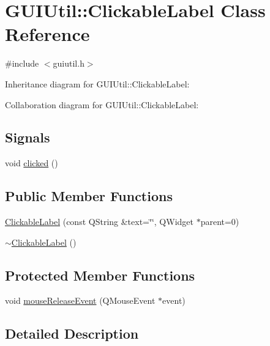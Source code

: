 \hypertarget{class_g_u_i_util_1_1_clickable_label}{}\section{G\+U\+I\+Util\+:\+:Clickable\+Label Class Reference}
\label{class_g_u_i_util_1_1_clickable_label}


{\ttfamily \#include $<$guiutil.\+h$>$}



Inheritance diagram for G\+U\+I\+Util\+:\+:Clickable\+Label\+:


Collaboration diagram for G\+U\+I\+Util\+:\+:Clickable\+Label\+:
\subsection*{Signals}
\begin{DoxyCompactItemize}
\item 
void \hyperlink{class_g_u_i_util_1_1_clickable_label_a6606940e3d7d916db187a9e89a0b7844}{clicked} ()
\end{DoxyCompactItemize}
\subsection*{Public Member Functions}
\begin{DoxyCompactItemize}
\item 
\hyperlink{class_g_u_i_util_1_1_clickable_label_a10c4a2a17cf216e9a1ba27389e827a82}{Clickable\+Label} (const Q\+String \&text=\char`\"{}\char`\"{}, Q\+Widget $\ast$parent=0)
\item 
\hyperlink{class_g_u_i_util_1_1_clickable_label_a54d1792cc5ea7c57f630328b84cfbe59}{$\sim$\+Clickable\+Label} ()
\end{DoxyCompactItemize}
\subsection*{Protected Member Functions}
\begin{DoxyCompactItemize}
\item 
void \hyperlink{class_g_u_i_util_1_1_clickable_label_a5bd4929d11bc3a714b55527d38e928fe}{mouse\+Release\+Event} (Q\+Mouse\+Event $\ast$event)
\end{DoxyCompactItemize}


\subsection{Detailed Description}



